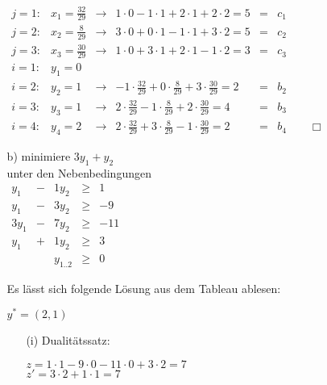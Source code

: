 \documentclass[a4paper,11pt]{article}
\begin{document}
\begin{enumerate}
\begin{enumerate}
        \(\begin{array}{llcrcl}
            j = 1: & x_1 = \frac{32}{29} & \rightarrow & 1 \cdot 0 - 1 \cdot 1 + 2 \cdot 1 + 2 \cdot 2 = 5 & = & c_1 \\
            j = 2: & x_2 =  \frac{8}{29} & \rightarrow & 3 \cdot 0 + 0 \cdot 1 - 1 \cdot 1 + 3 \cdot 2 = 5 & = & c_2 \\
            j = 3: & x_3 = \frac{30}{29} & \rightarrow & 1 \cdot 0 + 3 \cdot 1 + 2 \cdot 1 - 1 \cdot 2 = 3 & = & c_3 \\
            i = 1: & y_1 =             0 \\
            i = 2: & y_2 =             1 & \rightarrow &-1 \cdot \frac{32}{29} + 0 \cdot \frac{8}{29} + 3 \cdot \frac{30}{29} = 2 & = & b_2 \\
            i = 3: & y_3 =             1 & \rightarrow & 2 \cdot \frac{32}{29} - 1 \cdot \frac{8}{29} + 2 \cdot \frac{30}{29} = 4 & = & b_3 \\
            i = 4: & y_4 =             2 & \rightarrow & 2 \cdot \frac{32}{29} + 3 \cdot \frac{8}{29} - 1 \cdot \frac{30}{29} = 2 & = & b_4 \hspace{2em} \Box
        \end{array}\)

    \item[b)]
        minimiere \( 3y_1 + y_2 \)\\
        unter den Nebenbedingungen \\
        \(\begin{array}{rcrcrcr}
             y_1 & - & 1y_2 & \geq & 1\\
             y_1 & - & 3y_2 & \geq & -9\\
            3y_1 & - & 7y_2 & \geq & -11\\
             y_1 & + & 1y_2 & \geq & 3\\
            && y_{1..2} & \geq & 0
        \end{array}\)

        Es lässt sich folgende Lösung aus dem Tableau ablesen:

        \( y^* = (2, 1) \)

        \begin{enumerate}
        \item[(i)]
            Dualitätssatz:

            \( z = 1 \cdot 1 - 9 \cdot 0 - 11 \cdot 0 + 3 \cdot 2 = 7 \)\\
            \( z' = 3 \cdot 2 + 1 \cdot 1 = 7 \)


\end{enumerate}
\end{enumerate}
\end{enumerate}
\end{document}
